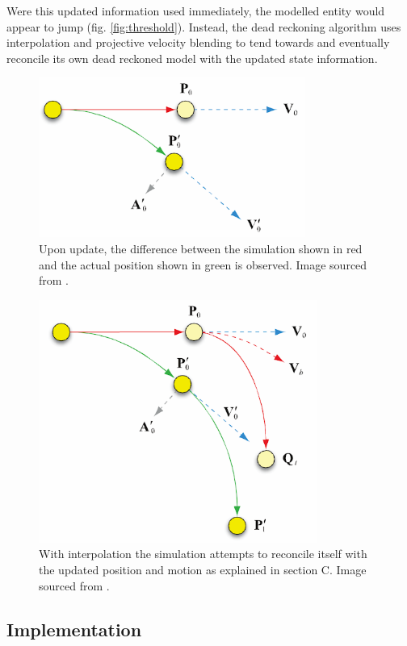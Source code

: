 \documentclass[journal]{IEEEtran}
\begin{document}
Were this updated information used immediately, the modelled entity would appear to jump (fig. \ref{fig:threshold}). Instead, the dead reckoning algorithm uses interpolation and projective velocity blending \cite{murphy2011believable} to tend towards and eventually reconcile its own dead reckoned model with the updated state information.

\begin{figure}[h]
    \centering
    \includegraphics[width=0.7\linewidth]{DR2.png}
    \caption{Upon update, the difference between the simulation shown in red and the actual position shown in green is observed. Image sourced from \cite{murphy2011believable}.}
    \label{fig:dr2}
\end{figure}

\begin{figure}[h]
    \centering
    \includegraphics[width=0.7\linewidth]{DR3.png}
    \caption{With interpolation the simulation attempts to reconcile itself with the updated position and motion as explained in section C. Image sourced from \cite{murphy2011believable}.}
    \label{fig:dr3}
\end{figure}

\subsection{Implementation} \label{implementation}
\end{document}
